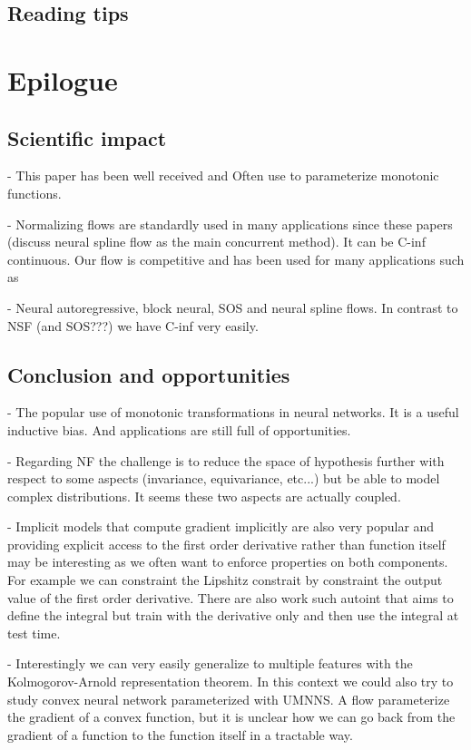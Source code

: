 \subsection{Reading tips}



\section{Epilogue}

\subsection{Scientific impact}
- This paper has been well received and Often use to parameterize monotonic functions.

- Normalizing flows are standardly used in many applications since these papers (discuss neural spline flow as the main concurrent method). It can be C-inf continuous. Our flow is competitive and has been used for many applications such as

- Neural autoregressive, block neural, SOS and neural spline flows. In contrast to NSF (and SOS???) we have C-inf very easily.

\subsection{Conclusion and opportunities}
- The popular use of monotonic transformations in neural networks. It is a useful inductive bias. And applications are still full of opportunities.

- Regarding NF the challenge is to reduce the space of hypothesis further with respect to some aspects (invariance, equivariance, etc...) but be able to model complex distributions. It seems these two aspects are actually coupled.

- Implicit models that compute gradient implicitly are also very popular and providing explicit access to the first order derivative rather than function itself may be interesting as we often want to enforce properties on both components. For example we can constraint the Lipshitz constrait by constraint the output value of the first order derivative. There are also work such autoint that aims to define the integral but train with the derivative only and then use the integral at test time.

- Interestingly we can very easily generalize to multiple features with the Kolmogorov-Arnold representation theorem. In this context we could also try to study convex neural network parameterized with UMNNS. A flow parameterize the gradient of a convex function, but it is unclear how we can go back from the gradient of a function to the function itself in a tractable way.
